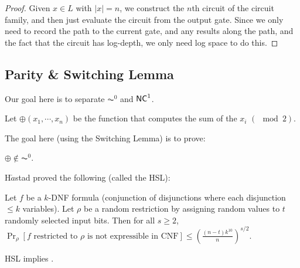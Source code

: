\begin{proof}
Given $x \in L$ with $|x| = n$, we construct the $n$th circuit of the circuit family, and then just evaluate the circuit from the output gate. Since we only need to record the path to the current gate, and any results along the path, and the fact that the circuit has log-depth, we only need log space to do this.
\end{proof}

\subsection{Parity \& Switching Lemma}
Our goal here is to separate $\AC^0$ and ${\mathsf{NC}}^1$.
\newcommand{\ParityF}{\oplus}
\begin{definition}
Let $\ParityF(x_1, \cdots, x_n)$ be the function that computes the sum of the $x_i$ $(\mod 2)$.
\end{definition}
The goal here (using the Switching Lemma) is to prove:
\begin{theorem}
\label{thm:parity_not_in_ac0}
$\ParityF \notin \AC^0$.
\end{theorem}
H$\mathring{a}$stad proved the following (called the HSL):
\begin{theorem}
Let $f$ be a $k$-DNF formula (conjunction of disjunctions where each disjunction $\le k$ variables). Let $\rho$ be a random restriction by assigning random values to $t$ randomly selected input bits. Then for all $s \ge 2$, $\Pr_{\rho}[\text{$f$ restricted to $\rho$ is not expressible in CNF}] \le (\frac{(n-t)k^{10}}{n})^{s/2}$.
\end{theorem}
\begin{lemma}
HSL implies .
\end{lemma}

